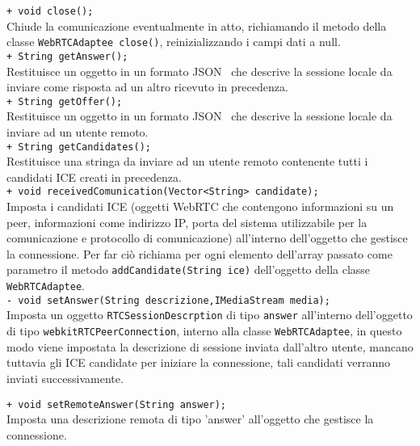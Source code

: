 {{\begin{sloppypar}
{{{\begin{itemize}
{					\texttt{+ void close();}\\
					Chiude la comunicazione eventualmente in atto, richiamando il metodo della classe \texttt{WebRTCAdaptee close()}, reinizializzando i campi dati a null.\\
					
					\texttt{+ String getAnswer();}\\
					Restituisce un oggetto in un formato JSON\g~ che descrive la sessione locale da inviare come risposta ad un altro ricevuto in precedenza.\\
					
					\texttt{+ String getOffer();}\\
					Restituisce un oggetto in un formato JSON\g~ che descrive la sessione locale da inviare ad un utente remoto.\\

					\texttt{+ String getCandidates();}\\
					Restituisce una stringa da inviare ad un utente remoto contenente tutti i candidati ICE creati in precedenza.\\

					\texttt{+ void receivedComunication(Vector<String> candidate);}\\
					Imposta i candidati ICE (oggetti WebRTC che contengono informazioni su un peer, informazioni come indirizzo IP, porta del sistema utilizzabile per la comunicazione e protocollo di comunicazione) all'interno dell'oggetto che gestisce la connessione. Per far ciò richiama per ogni elemento dell'array passato come parametro il metodo \texttt{addCandidate(String ice)} dell'oggetto della classe \texttt{WebRTCAdaptee}.\\

					\texttt{- void setAnswer(String descrizione,IMediaStream media);}\\
					Imposta un oggetto \texttt{RTCSessionDescrption} di tipo \texttt{answer} all'interno dell'oggetto di tipo \texttt{webkitRTCPeerConnection}, interno alla classe \texttt{WebRTCAdaptee}, in questo modo viene impostata la descrizione di sessione inviata dall'altro utente, mancano tuttavia gli ICE candidate per iniziare la connessione, tali candidati verranno inviati successivamente.

					\texttt{+ void setRemoteAnswer(String answer);}\\
					Imposta una descrizione remota di tipo 'answer' all'oggetto che gestisce la connessione.\\

}
\end{itemize}}}}
\end{sloppypar}}}
